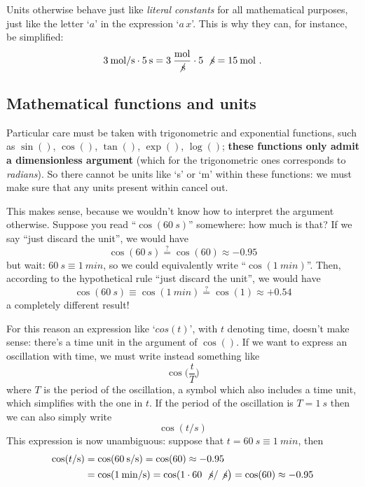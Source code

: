 \documentclass[a4paper,12pt,%
onecolumn,oneside,titlepage,%
british%
]{memoir}
\renewcommand*{\|}[1][]{\nonscript\:#1\vert\nonscript\:\mathopen{}}
\begin{document}
Units otherwise behave just like \emph{literal constants} for all mathematical purposes, just like the letter \enquote*{$a$} in the expression \enquote*{$a\, x$}. This is why they can, for instance, be simplified:
\begin{equation*}
  \qty{3}{mol/s} \cdot \qty{5}{s} = 
  \num{3}\:\frac{\unit{mol}}{\not\unit{s}} \cdot \num{5}\:\not\unit{s} = \qty{15}{mol} \ .
\end{equation*}

\subsection{Mathematical functions and units}
\label{sec:functions_units}

Particular care must be taken with trigonometric and exponential functions, such as $\sin()$, $\cos()$, $\tan()$, $\exp()$, $\log()$; \textbf{these functions only admit a dimensionless argument} (which for the trigonometric ones corresponds to \emph{radians}). So there cannot be units like \enquote*{\unit{s}} or \enquote*{\unit{m}} within these functions: we must make sure that any units present within cancel out.

This makes sense, because we wouldn't know how to interpret the argument otherwise. Suppose you read \enquote{$\cos(\qty{60}{s})$} somewhere: how much is that? If we say \enquote{just discard the unit}, we would have
\begin{equation*}
  \cos(\qty{60}{s}) \stackrel{?}{=} \cos(60) \approx -0.95
\end{equation*}
but wait: $\qty{60}{s}\equiv\qty{1}{min}$, so we could equivalently write \enquote{$\cos(\qty{1}{min})$}. Then, according to the hypothetical rule \enquote{just discard the unit}, we would have
\begin{equation*}
  \cos(\qty{60}{s}) \equiv \cos(\qty{1}{min})\stackrel{?}{=} \cos(1) \approx +0.54
\end{equation*}
a completely different result!

For this reason an expression like \enquote*{$cos(t)$}, with $t$ denoting time, doesn't make sense: there's a time unit in the argument of $\cos()$. If we want to express an oscillation with time, we must write instead something like
\begin{equation*}
  \cos\biggl(\frac{t}{T}\biggr)
\end{equation*}
where $T$ is the period of the oscillation, a symbol which also includes a time unit, which simplifies with the one in $t$. If the period of the oscillation is $T=\qty{1}{s}$ then we can also simply write
\begin{equation*}
  \cos(t/\unit{s})
\end{equation*}
This expression is now unambiguous: suppose that $t=\qty{60}{s}\equiv\qty{1}{min}$, then
\begin{equation*}
  \begin{aligned}
    \cos(t/\unit{s})
    &= \cos(\qty{60}{s}/\unit{s}) =\cos(60) \approx -0.95
    \\
    &= \cos(\qty{1}{min}/\unit{s}) =\cos(1\cdot 60\:\not\unit{s}/\not\unit{s}\bigr)
=\cos(60) \approx -0.95
  \end{aligned}
\end{equation*}
\end{document}
